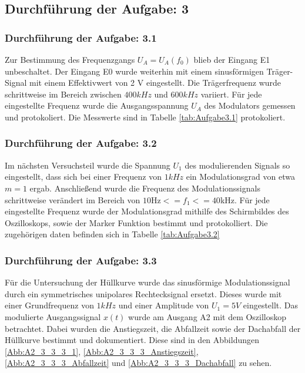 \documentclass[12pt]{scrartcl}
\begin{document}
\newpage
\subsection{Durchführung der Aufgabe: 3}
\subsubsection*{Durchführung der Aufgabe: 3.1}
Zur Bestimmung des Frequenzgangs $U_A = U_A(f_0)$ blieb der Eingang E1 unbeschaltet. Der Eingang E0 wurde weiterhin mit einem sinusförmigen Träger-Signal mit einem Effektivwert von 2 V 
eingestellt. Die Trägerfrequenz wurde schrittweise im Bereich zwischen $400 kHz$ und $600 kHz$ variiert.
Für jede eingestellte Frequenz wurde die Ausgangsspannung $U_A$ des Modulators gemessen und protokoliert. Die Messwerte sind in Tabelle \ref{tab:Aufgabe3.1} protokoliert.





\subsubsection*{Durchführung der Aufgabe: 3.2}
Im nächsten Versuchsteil wurde die Spannung $U_1$ des modulierenden Signals so eingestellt, dass sich bei einer Frequenz von $1 kHz$ ein Modulationsgrad von etwa $ m = 1 $ ergab. Anschließend 
wurde die Frequenz des Modulationssignals schrittweise verändert im Bereich von $10 \text{Hz} <= f_1 <= 40 $kHz.
Für jede eingestellte Frequenz wurde der Modulationsgrad mithilfe des Schirmbildes des Oszilloskops, sowie der Marker Funktion bestimmt und protokolliert. Die zugehörigen daten befinden sich 
in Tabelle \ref{tab:Aufgabe3.2}






\subsubsection*{Durchführung der Aufgabe: 3.3}
Für die Untersuchung der Hüllkurve wurde das sinusförmige Modulationssignal durch ein symmetrisches unipolares Rechtecksignal ersetzt. Dieses wurde mit einer Grundfrequenz von $1 kHz$ und einer
 Amplitude von $U_1= 5 V$ eingestellt.
Das modulierte Ausgangssignal $x(t)$ wurde am Ausgang A2 mit dem Oszilloskop betrachtet. Dabei wurden die Anstiegszeit, die Abfallzeit sowie der Dachabfall der Hüllkurve bestimmt und 
dokumentiert. Diese sind in den Abbildungen \ref{Abb:A2_3_3_3_1}, \ref{Abb:A2_3_3_3_Anstiegszeit},\ref{Abb:A2_3_3_3_Abfallzeit} und \ref{Abb:A2_3_3_3_Dachabfall} zu sehen. 
\end{document}
